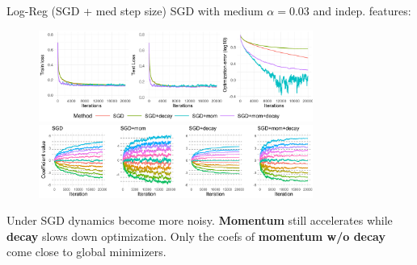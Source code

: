 \documentclass[11pt,compress,t,notes=noshow, xcolor=table]{beamer}
\begin{document}
\begin{vbframe}{Log-Reg (SGD + med step size)}
\vspace{-0.4cm}
SGD with medium $\alpha=0.03$ and indep. features:
\begin{figure}
            \includegraphics[width=0.8\textwidth]{slides/04-multivariate-first-order/figure_man/simu_linmod/SGD_log_med_lr_iters.pdf} \\
             \includegraphics[width=0.8\textwidth]{slides/04-multivariate-first-order/figure_man/simu_linmod/SGD_log_coef_med.pdf}\\
            \begin{footnotesize}
            \end{footnotesize}
\end{figure}
Under SGD dynamics become more noisy. \textbf{Momentum} still accelerates while \textbf{decay} slows down optimization. Only the coefs of \textbf{momentum w/o decay} come close to global minimizers.
\end{vbframe}
\end{document}
